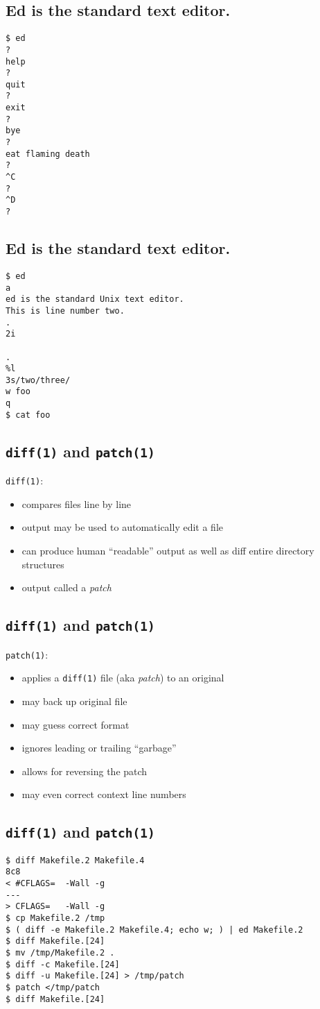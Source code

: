 \documentclass[xga]{xdvislides}
\begin{document}
\subsection{Ed is the standard text editor.}
\begin{verbatim}
$ ed
?
help
?
quit
?
exit
?
bye
?
eat flaming death
?
^C
?
^D
?
\end{verbatim}

\subsection{Ed is the standard text editor.}
\begin{verbatim}
$ ed
a
ed is the standard Unix text editor.
This is line number two.
.
2i

.
%l
3s/two/three/
w foo
q
$ cat foo
\end{verbatim}

\subsection{{\tt diff(1)} and {\tt patch(1)}}
{\tt diff(1)}:
\begin{itemize}
	\item compares files line by line
	\item output may be used to automatically edit a file
	\item can produce human ``readable'' output as well as diff entire
		directory structures
	\item output called a {\em patch}
\end{itemize}

\subsection{{\tt diff(1)} and {\tt patch(1)}}
{\tt patch(1)}:
\begin{itemize}
	\item applies a {\tt diff(1)} file (aka {\em patch}) to an original
	\item may back up original file
	\item may guess correct format
	\item ignores leading or trailing ``garbage''
	\item allows for reversing the patch
	\item may even correct context line numbers
\end{itemize}

\subsection{{\tt diff(1)} and {\tt patch(1)}}
\begin{verbatim}
$ diff Makefile.2 Makefile.4
8c8
< #CFLAGS=	-Wall -g
---
> CFLAGS=	-Wall -g
$ cp Makefile.2 /tmp
$ ( diff -e Makefile.2 Makefile.4; echo w; ) | ed Makefile.2
$ diff Makefile.[24]
$ mv /tmp/Makefile.2 .
$ diff -c Makefile.[24]
$ diff -u Makefile.[24] > /tmp/patch
$ patch </tmp/patch
$ diff Makefile.[24]
\end{verbatim}
\end{document}
